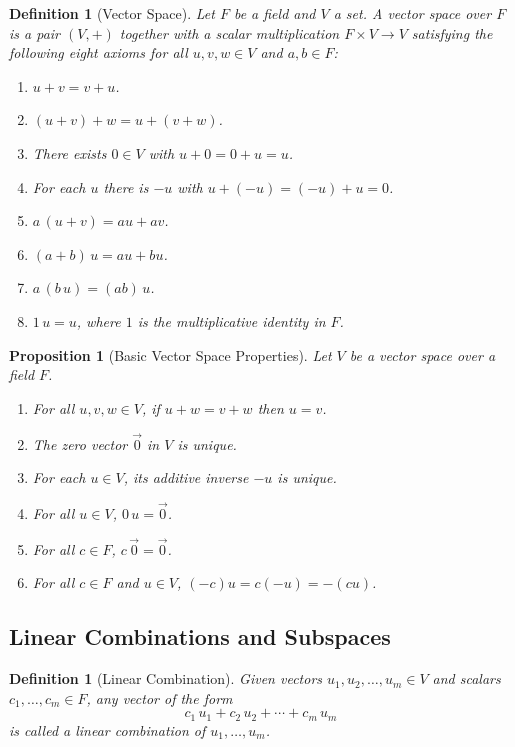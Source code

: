 \documentclass[12pt]{article}
\theoremstyle{break}             %
\newtheorem{prop}[thm]{Proposition}%
\newtheorem{defn}[thm]{Definition}
\begin{document}
\begin{defn}[Vector Space]
Let \(F\) be a field and \(V\) a set.  A \emph{vector space over \(F\)} is a pair \((V,+)\) together with a scalar multiplication \(F\times V\to V\) satisfying the following eight axioms for all \(u,v,w\in V\) and \(a,b\in F\):
\begin{enumerate}
  \item \(u+v = v+u\).  
  \item \((u+v)+w = u+(v+w)\).  
  \item There exists \(0\in V\) with \(u+0=0+u=u\).  
  \item For each \(u\) there is \(-u\) with \(u+(-u)=(-u)+u=0\).  
  \item \(a\,(u+v)=au + av\).  
  \item \((a+b)\,u = au + bu\).  
  \item \(a\,(b\,u) = (ab)\,u\).  
  \item \(1\,u = u\), where \(1\) is the multiplicative identity in \(F\).
\end{enumerate}
\end{defn}


\begin{prop}[Basic Vector Space Properties]
Let \(V\) be a vector space over a field \(F\).
\begin{enumerate}
\item For all \(u,v,w \in V\), if \(u + w = v + w\) then \(u = v\).
\item The zero vector \(\vec{0}\) in \(V\) is unique.
\item For each \(u \in V\), its additive inverse \(-u\) is unique.
\item For all \(u \in V\), \(0\,u = \vec{0}\).
\item For all \(c \in F\), \(c\,\vec{0} = \vec{0}\).
\item For all \(c \in F\) and \(u \in V\), \((-c)u = c(-u) = -(cu)\).
\end{enumerate}
\end{prop}

\subsection{Linear Combinations and Subspaces}

\begin{defn}[Linear Combination]
Given vectors \(u_1,u_2,\dots,u_m\in V\) and scalars \(c_1,\dots,c_m\in F\), any vector of the form
\[
  c_1\,u_1 + c_2\,u_2 + \cdots + c_m\,u_m
\]
is called a \emph{linear combination} of \(u_1,\dots,u_m\).
\end{defn}
\end{document}
